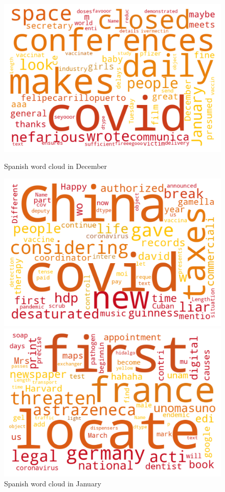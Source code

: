 \begin{landscape}
\newpage

\begin{figure}[!htb]
  \includegraphics[width=\linewidth]{December es word cloud.png}
  \caption{Spanish word cloud in December}\label{fig:decemberes}
\endminipage\hfill
{}
  \includegraphics[width=\linewidth]{January es word cloud.png}
  \caption{Spanish word cloud in January}\label{fig:januaryes}
\endminipage\hfill
{}
  \includegraphics[width=\linewidth]{February es word cloud.png}

\end{figure}
\end{landscape}

